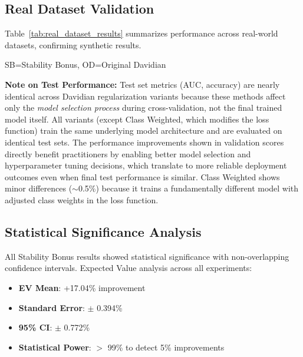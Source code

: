 \documentclass[11pt,twocolumn]{article}
\begin{document}
\subsection{Real Dataset Validation}

Table~\ref{tab:real_dataset_results} summarizes performance across real-world datasets, confirming synthetic results.

\begin{table}[h]
\centering
\caption{Real Dataset Validation Results}
\label{tab:real_dataset_results}
\par\vspace{2pt}
{\scriptsize SB=Stability Bonus, OD=Original Davidian}
\end{table}

\textbf{Note on Test Performance:} Test set metrics (AUC, accuracy) are nearly identical across Davidian regularization variants because these methods affect only the \textit{model selection process} during cross-validation, not the final trained model itself. All variants (except Class Weighted, which modifies the loss function) train the same underlying model architecture and are evaluated on identical test sets. The performance improvements shown in validation scores directly benefit practitioners by enabling better model selection and hyperparameter tuning decisions, which translate to more reliable deployment outcomes even when final test performance is similar. Class Weighted shows minor differences ($\sim$0.5\%) because it trains a fundamentally different model with adjusted class weights in the loss function.

\subsection{Statistical Significance Analysis}

All Stability Bonus results showed statistical significance with non-overlapping confidence intervals. Expected Value analysis across all experiments:
\begin{itemize}
    \item \textbf{EV Mean}: +17.04\% improvement
    \item \textbf{Standard Error}: $\pm$ 0.394\%
    \item \textbf{95\% CI}: $\pm$ 0.772\%
    \item \textbf{Statistical Power}: $>$ 99\% to detect 5\% improvements
\end{itemize}
\end{document}
